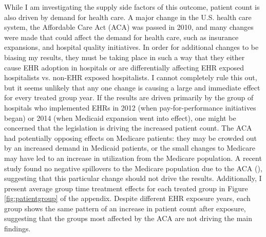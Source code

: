 \documentclass[12pt]{article}
\begin{document}
While I am investigating the supply side factors of this outcome, patient count is also driven by demand for health care. A major change in the U.S. health care system, the Affordable Care Act (ACA) was passed in 2010, and many changes were made that could affect the demand for health care, such as insurance expansions, and hospital quality initiatives. In order for additional changes to be biasing my results, they must be taking place in such a way that they either cause EHR adoption in hospitals or are differentially affecting EHR exposed hospitalists vs. non-EHR exposed hospitalists. I cannot completely rule this out, but it seems unlikely that any one change is causing a large and immediate effect for every treated group year. If the results are driven primarily by the group of hospitals who implemented EHRs in 2012 (when pay-for-performance initiatives began) or 2014 (when Medicaid expansion went into effect), one might be concerned that the legislation is driving the increased patient count. The ACA had potentially opposing effects on Medicare patients: they may be crowded out by an increased demand in Medicaid patients, or the small changes to Medicare may have led to an increase in utilization from the Medicare population. A recent study found no negative spillovers to the Medicare population due to the ACA (\cite{carey2020impact}), suggesting that this particular change should not drive the results. Additionally, I present average group time treatment effects for each treated group in Figure \ref{fig:patientgroup} of the appendix. Despite different EHR exposure years, each group shows the same pattern of an increase in patient count after exposure, suggesting that the groups most affected by the ACA are not driving the main findings. 
\end{document}

